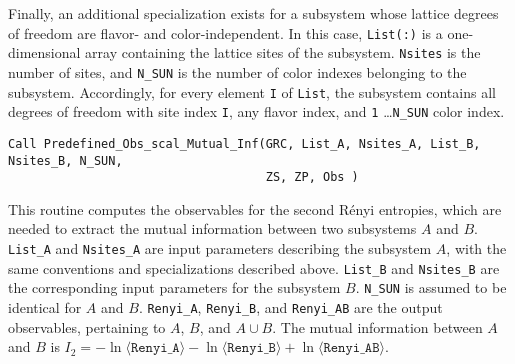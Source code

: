 Finally, an additional specialization exists for a subsystem whose lattice degrees of freedom are flavor- and color-independent. In this case, \texttt{List(:)} is a one-dimensional array containing the lattice sites of the subsystem. \texttt{Nsites} is the number of sites, and \texttt{N\_SUN} is the number of color indexes belonging to the subsystem.
Accordingly, for every element \texttt{I} of \texttt{List}, the subsystem contains all degrees of freedom with site index \texttt{I}, any flavor index, and \texttt{1} \ldots \texttt{N\_SUN} color index.

\begin{lstlisting}[style=fortran,breaklines=true]
Call Predefined_Obs_scal_Mutual_Inf(GRC, List_A, Nsites_A, List_B, Nsites_B, N_SUN, 
                                    ZS, ZP, Obs )
\end{lstlisting}
This routine computes the observables for the second R\'enyi entropies, which are needed to extract the mutual information between two subsystems $A$ and $B$.
\texttt{List\_A} and \texttt{Nsites\_A} are input parameters describing the subsystem $A$, with the same conventions and specializations described above.
\texttt{List\_B} and \texttt{Nsites\_B} are the corresponding input parameters for the subsystem $B$. \texttt{N\_SUN} is assumed to be identical for $A$ and $B$.
\texttt{Renyi\_A}, \texttt{Renyi\_B}, and \texttt{Renyi\_AB} are the output observables, pertaining to $A$, $B$, and $A\cup B$. The mutual information between $A$ and $B$ is $I_2=-\ln \langle \texttt{Renyi\_A}\rangle -\ln \langle \texttt{Renyi\_B}\rangle +\ln \langle \texttt{Renyi\_AB}\rangle$.
